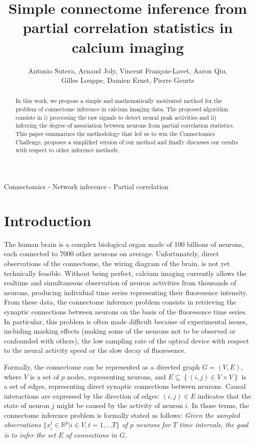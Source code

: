 \documentclass[wcp]{jmlr}
\title{Simple connectome inference from partial correlation statistics in calcium imaging}
\author{Antonio Sutera,
        Arnaud Joly,
        Vincent François-Lavet,
        Aaron Qiu, \\
        Gilles Louppe,
        Damien Ernst,
        Pierre Geurts}
\begin{document}
\maketitle

\begin{abstract}
In this work, we propose a simple and mathematically motivated method for the
problem of connectome inference in calcium imaging data. The proposed algorithm
consists in i) processing the raw signals to detect neural peak activities and ii)
inferring the degree of association between neurons from partial correlation
statistics.  This paper summarizes the methodology that led us to win the
Connectomics Challenge, proposes a simplified version of our method and finally
discusses our results with respect to other inference methods.
\end{abstract}

\begin{keywords}
Connectomics - Network inference - Partial correlation
\end{keywords}


\section{Introduction}\label{sec:intro}

The human brain is a complex biological organ made of 100 billions of neurons,
each connected to 7000 other neurons on average. Unfortunately, direct
observations of the connectome, the wiring diagram of the brain, is not yet
technically feasible. Without being perfect, calcium imaging currently allows
the realtime and simultaneous observation of neuron activities from thousands
of neurons, producing individual time series representing their fluoresence
intensity. From these data, the connectome inference problem consists in
retrieving the synaptic connections between neurons on the basis of the
fluoresence time series. In particular, this problem is often made difficult
because of experimental issues, including masking effects (making some of the
neurons not to be observed or confounded with others), the low sampling rate of
the optical device with respect to the neural activity speed or the slow decay
of fluoresence.

Formally, the connectome can be represented as a directed graph $G=(V,E)$,
where $V$ is a set of $p$ nodes, representing neurons, and $E \subseteq
\left\{(i, j) \in V \times V\right\}$ is a set of edges, representing direct
synaptic connections between neurons. Causal interactions are expressed by the
direction of edges: $(i, j) \in E$ indicates that the state of neuron $j$ might
be caused by the activity of neuron $i$. In those terms,  the connectome
inference problem is formally stated as follows:  \textit{Given the sampled
observations $\{ x^t_i \in \mathbb{R}^{p} | i \in V, t = 1, \dots T \}$ of $p$
neurons for $T$ time intervals, the goal is to infer the set $E$ of connections in $G$.}
\end{document}
